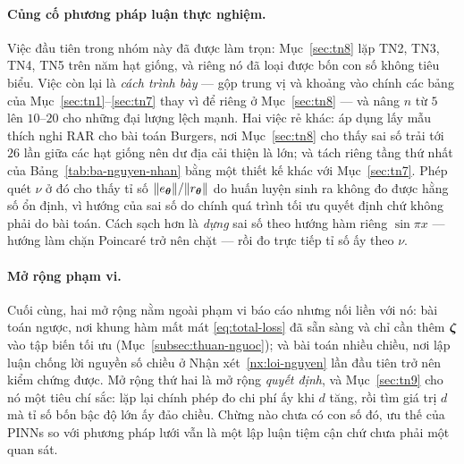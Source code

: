\paragraph{Củng cố phương pháp luận thực nghiệm.} Việc đầu tiên trong nhóm này
đã được làm trọn: Mục~\ref{sec:tn8} lặp TN2, TN3, TN4, TN5 trên năm hạt giống,
và riêng nó đã loại được bốn con số không tiêu biểu. Việc còn lại là
\emph{cách trình bày} --- gộp trung vị và khoảng vào chính các bảng của
Mục~\ref{sec:tn1}--\ref{sec:tn7} thay vì để riêng ở Mục~\ref{sec:tn8} --- và
nâng $n$ từ $5$ lên $10$--$20$ cho những đại lượng lệch mạnh. Hai việc rẻ khác:
áp dụng lấy mẫu thích nghi RAR cho bài toán Burgers, nơi Mục~\ref{sec:tn8} cho
thấy sai số trải tới $26$ lần giữa các hạt giống nên dư địa cải thiện là lớn;
và tách riêng tầng thứ nhất của Bảng~\ref{tab:ba-nguyen-nhan} bằng một thiết kế
khác với Mục~\ref{sec:tn7}. Phép quét $\nu$ ở đó cho thấy tỉ số
$\lVert e_{\bm{\theta}}\rVert/\lVert r_{\bm{\theta}}\rVert$ do huấn luyện sinh ra không đo được hằng
số ổn định, vì hướng của sai số do chính quá trình tối ưu quyết định chứ không
phải do bài toán. Cách sạch hơn là \emph{dựng} sai số theo hướng hàm riêng
$\sin \pi x$ --- hướng làm chặn Poincaré trở nên chặt --- rồi đo trực tiếp tỉ số
ấy theo $\nu$.

\paragraph{Mở rộng phạm vi.} Cuối cùng, hai mở rộng nằm ngoài phạm vi báo cáo
nhưng nối liền với nó: bài toán ngược, nơi khung hàm mất mát \eqref{eq:total-loss}
đã sẵn sàng và chỉ cần thêm $\bm{\zeta}$ vào tập biến tối ưu
(Mục~\ref{subsec:thuan-nguoc}); và bài toán nhiều chiều, nơi lập luận chống lời
nguyền số chiều ở Nhận xét~\ref{nx:loi-nguyen} lần đầu tiên trở nên kiểm chứng
được. Mở rộng thứ hai là mở rộng \emph{quyết định}, và Mục~\ref{sec:tn9} cho nó
một tiêu chí sắc: lặp lại chính phép đo chi phí ấy khi $d$ tăng, rồi tìm giá trị
$d$ mà tỉ số bốn bậc độ lớn ấy đảo chiều. Chừng nào chưa có con số đó, ưu thế của PINNs
so với phương pháp lưới vẫn là một lập luận tiệm cận chứ chưa phải một quan sát.
